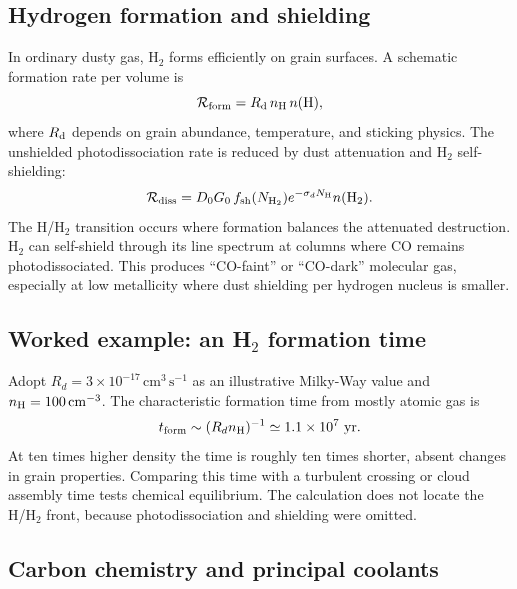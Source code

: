 \subsection{Hydrogen formation and shielding}

In ordinary dusty gas, H$_2$ forms efficiently on grain surfaces.  A schematic
formation rate per volume is
\begin{equation}
 \mathcal{R}_{\rm form}=R_{\rm d}\,n_{\rm H}\,n({\rm H}),
 \label{eq:h2-formation}
\end{equation}
where $R_{\rm d}$ depends on grain abundance, temperature, and sticking physics.  The
unshielded photodissociation rate is reduced by dust attenuation and H$_2$
self-shielding:
\begin{equation}
 \mathcal{R}_{\rm diss}=D_0G_0\,
 f_{\rm sh}(N_{\rm H_2})e^{-\sigma_{d}N_{\rm H}}
 n({\rm H_2}).
 \label{eq:h2-dissociation}
\end{equation}
The H/H$_2$ transition occurs where formation balances the attenuated destruction.
H$_2$ can self-shield through its line spectrum at columns where CO remains
photodissociated.  This produces ``CO-faint'' or ``CO-dark'' molecular gas, especially
at low metallicity where dust shielding per hydrogen nucleus is smaller.

\subsection{Worked example: an \texorpdfstring{H$_2$}{H2} formation time}

Adopt $R_d=3\times10^{-17}\,\mathrm{cm^3\,s^{-1}}$ as an illustrative Milky-Way
value and $n_{\rm H}=100\,\mathrm{cm^{-3}}$.  The characteristic formation time from
mostly atomic gas is
\begin{equation}
 t_{\rm form}\sim(R_dn_{\rm H})^{-1}
 \simeq1.1\times10^7~\mathrm{yr}.
 \label{eq:h2-formation-time-example}
\end{equation}
At ten times higher density the time is roughly ten times shorter, absent changes in
grain properties.  Comparing this time with a turbulent crossing or cloud assembly
time tests chemical equilibrium.  The calculation does not locate the H/H$_2$
front, because photodissociation and shielding were omitted.

\subsection{Carbon chemistry and principal coolants}

